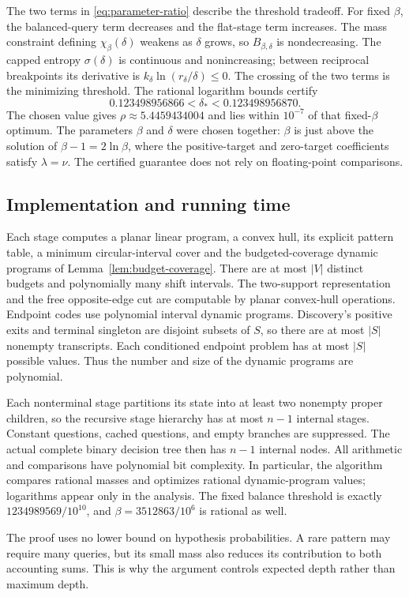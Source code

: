 The two terms in \eqref{eq:parameter-ratio} describe the threshold
tradeoff. For fixed $\beta$, the balanced-query term decreases
and the flat-stage term increases. The mass constraint defining
$\chi_\beta(\delta)$ weakens as $\delta$ grows, so
$B_{\beta,\delta}$ is nondecreasing.
The capped entropy
$\sigma(\delta)$ is continuous and nonincreasing; between reciprocal
breakpoints its derivative is
$k_\delta\ln(r_\delta/\delta)\le0$.
The crossing of the two terms is the
minimizing threshold. The rational logarithm bounds certify
\[
 0.123498956866<\delta_*<0.123498956870.
\]
The chosen value gives $\rho\approx5.4459434004$ and lies within
$10^{-7}$ of that fixed-$\beta$ optimum. The parameters $\beta$
and $\delta$ were chosen together: $\beta$ is just above the
solution of $\beta-1=2\ln\beta$, where the positive-target and
zero-target coefficients satisfy $\lambda=\nu$.
The certified guarantee does not rely on floating-point comparisons.

\subsection{Implementation and running time}

Each stage computes a planar linear program, a convex hull, its
explicit pattern table, a minimum circular-interval cover and
the budgeted-coverage dynamic programs of
Lemma~\ref{lem:budget-coverage}. There are at most $|V|$ distinct
budgets and polynomially many shift intervals.
The two-support representation and the free opposite-edge cut
are computable by planar convex-hull operations.
Endpoint codes use polynomial interval dynamic programs.
Discovery's positive exits and terminal singleton are disjoint
subsets of $S$, so there are at most $|S|$ nonempty transcripts.
Each conditioned endpoint problem has at most $|S|$ possible
values. Thus the number and size of the dynamic programs are polynomial.

Each nonterminal stage partitions its state into at least two
nonempty proper children, so the recursive stage hierarchy has at
most $n-1$ internal stages. Constant questions, cached questions,
and empty branches are suppressed. The actual complete binary
decision tree then has $n-1$ internal nodes.
All arithmetic and comparisons have polynomial bit complexity.
In particular, the algorithm compares rational masses and optimizes
rational dynamic-program values; logarithms appear only in the
analysis. The fixed balance threshold is exactly
$1234989569/10^{10}$, and $\beta=3512863/10^6$ is rational as well.

The proof uses no lower bound on hypothesis probabilities.
A rare pattern may require many queries, but its small mass also
reduces its contribution to both accounting sums. This is why the
argument controls expected depth rather than maximum depth.

